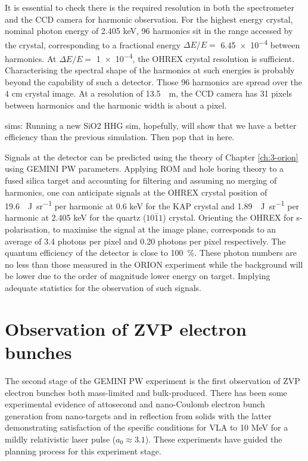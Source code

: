 It is essential to check there is the required resolution in both the spectrometer and the CCD camera for harmonic observation. For the highest energy crystal, nominal photon energy of 2.405 keV, 96 harmonics sit in the range accessed by the crystal, corresponding to a fractional energy $\Delta E/E =$ \num{6.45e-4} between harmonics. At  $\Delta E/E =$ \num{1e-4}, the OHREX crystal resolution is sufficient. Characterising the spectral shape of the harmonics at such energies is probably beyond the capability of such a detector. Those 96 harmonics are spread over the 4 cm crystal image. At a resolution of \qty{13.5}{\mu m}, the CCD camera has 31 pixels between harmonics and the harmonic width is about a pixel.

sims:
Running a new SiO2 HHG sim, hopefully, will show that we have a better efficiency than the previous simulation. Then pop that in here.

Signals at the detector can be predicted using the theory of Chapter \ref{ch:3-orion} using GEMINI PW parameters. Applying ROM and hole boring theory to a fused silica target and accounting for filtering and assuming no merging of harmonics, one can anticipate signals at the OHREX crystal position of \qty{19.6}{\mu J.sr^{-1}} per harmonic at 0.6 keV for the KAP crystal and \qty{1.89}{\mu J.sr^{-1}} per harmonic at 2.405 keV for the quartz ($10\bar{1}1$) crystal. Orienting the OHREX for s-polarisation, to maximise the signal at the image plane, corresponds to an average of 3.4 photons per pixel and 0.20 photons per pixel respectively. The quantum efficiency of the detector is close to \qty{100}{\%}. These photon numbers are no less than those measured in the ORION experiment while the background will be lower due to the order of magnitude lower energy on target. Implying adequate statistics for the observation of such signals.


\section{Observation of ZVP electron bunches}\label{sec:ch4-zvp}
The second stage of the GEMINI PW experiment is the first observation of ZVP electron bunches both mass-limited and bulk-produced. There has been some experimental evidence of attosecond and nano-Coulomb electron bunch generation from nano-targets \cite{cardenasSubcycleDynamicsRelativistic2019,hornyGenerationSingleAttosecond2021} and in reflection from solids \cite{linIsolatedAttosecondElectron2020, thevenetVacuumLaserAcceleration2016} with the latter demonstrating satisfaction of the specific conditions for \ac{VLA} to 10 MeV for a mildly relativistic laser pulse ($a_0 \approx 3.1$). These experiments have guided the planning process for this experiment stage.

